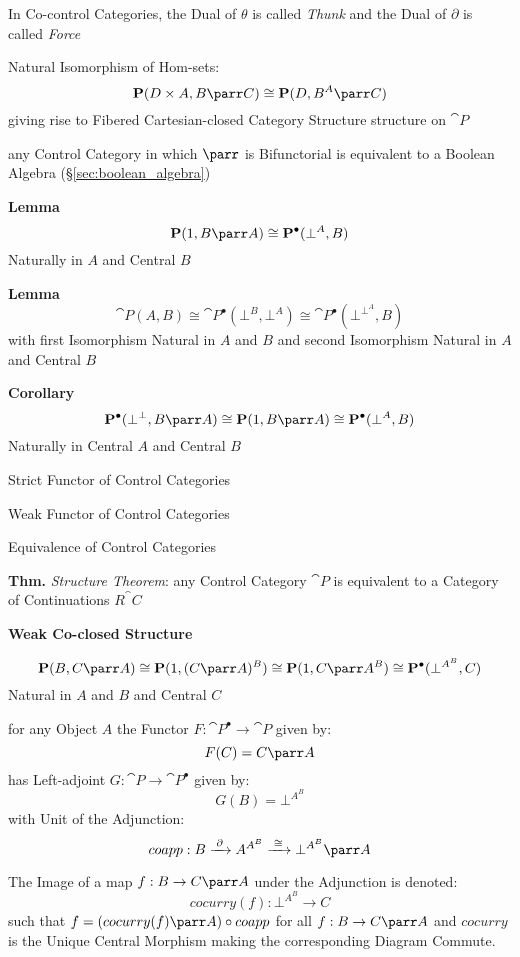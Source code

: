 In Co-control Categories, the Dual of $\theta$ is called \emph{Thunk}
and the Dual of $\partial$ is called \emph{Force}

Natural Isomorphism of Hom-sets:
\[
  \cat{P}(D \times A, B \parr C) \cong \cat{P}(D,B^A \parr C)
\]
giving rise to Fibered Cartesian-closed Category Structure structure
on $\cat{P}$

any Control Category in which $\parr$ is Bifunctorial is equivalent to
a Boolean Algebra (\S\ref{sec:boolean_algebra})

\textbf{Lemma}
\[
  \cat{P}(1,B \parr A) \cong \cat{P}^\bullet(\bot^A,B)
\]
Naturally in $A$ and Central $B$

\textbf{Lemma}
\[
  \cat{P}(A,B) \cong \cat{P}^\bullet(\bot^B,\bot^A) \cong
  \cat{P}^\bullet(\bot^{\bot^A},B)
\]
with first Isomorphism Natural in $A$ and $B$ and second Isomorphism
Natural in $A$ and Central $B$ %

\textbf{Corollary}
\[
  \cat{P}^\bullet(\bot^\bot,B \parr A) \cong
  \cat{P}(1,B \parr A) \cong
  \cat{P}^\bullet(\bot^A,B)
\]
Naturally in Central $A$ and Central $B$


\asterism


Strict Functor of Control Categories

Weak Functor of Control Categories

Equivalence of Control Categories

\textbf{Thm.} \emph{Structure Theorem}: any Control Category $\cat{P}$
is equivalent to a Category of Continuations $R^\cat{C}$ %


\textbf{Weak Co-closed Structure}

\[
  \cat{P}(B,C \parr A) \cong \cat{P}(1,(C \parr A)^B) \cong
    \cat{P}(1,C \parr A^B) \cong
    \cat{P}^\bullet(\bot^{A^B},C)
\]
Natural in $A$ and $B$ and Central $C$

for any Object $A$ the Functor $F : \cat{P}^\bullet \rightarrow
\cat{P}$ given by:
\[
  F(C) = C \parr A
\]
has Left-adjoint $G : \cat{P} \rightarrow \cat{P}^\bullet$ given by:
\[
  G(B) = \bot^{A^B}
\]
with Unit of the Adjunction:
\[
  coapp : B \xrightarrow{\;\partial\;} A^{A^B} \xrightarrow{\;\cong\;}
    \bot^{A^B} \parr A
\]

The Image of a map $f : B \rightarrow C \parr A$ under the Adjunction
is denoted:
\[
  cocurry(f) : \bot^{A^B} \rightarrow C
\]
such that $f = (cocurry(f) \parr A) \circ coapp$ for all $f : B
\rightarrow C \parr A$ and $cocurry$ is the Unique Central Morphism
making the corresponding Diagram Commute.

